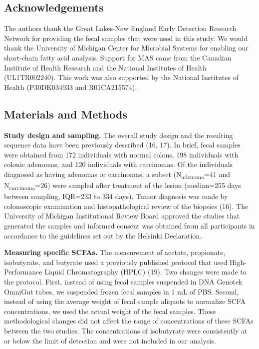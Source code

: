 \documentclass[11pt,]{article}
\begin{document}
\hypertarget{acknowledgements}{%
\subsection{Acknowledgements}\label{acknowledgements}}

The authors thank the Great Lakes-New England Early Detection Research
Network for providing the fecal samples that were used in this study. We
would thank the University of Michigan Center for Microbial Systems for
enabling our short-chain fatty acid analysis. Support for MAS came from
the Canadian Institute of Health Research and the National Institutes of
Health (UL1TR002240). This work was also supported by the National
Institutes of Health (P30DK034933 and R01CA215574).

\newpage

\hypertarget{materials-and-methods}{%
\subsection{Materials and Methods}\label{materials-and-methods}}

\textbf{Study design and sampling.} The overall study design and the
resulting sequence data have been previously described (16, 17). In
brief, fecal samples were obtained from 172 individuals with normal
colons, 198 individuals with colonic adenomas, and 120 individuals with
carcinomas. Of the individuals diagnosed as having adenomas or
carcinomas, a subset (N\textsubscript{adenoma}=41 and
N\textsubscript{carcinoma}=26) were sampled after treatment of the
lesion (median=255 days between sampling, IQR=233 to 334 days). Tumor
diagnosis was made by colonoscopic examination and histopathological
review of the biopsies (16). The University of Michigan Institutional
Review Board approved the studies that generated the samples and
informed consent was obtained from all participants in accordance to the
guidelines set out by the Helsinki Declaration.

\textbf{Measuring specific SCFAs.} The measurement of acetate,
propionate, isobutyrate, and butyrate used a previously published
protocol that used High-Performance Liquid Chromatography (HPLC) (19).
Two changes were made to the protocol. First, instead of using fecal
samples suspended in DNA Genotek OmniGut tubes, we suspended frozen
fecal samples in 1 mL of PBS. Second, instead of using the average
weight of fecal sample aliquots to normalize SCFA concentrations, we
used the actual weight of the fecal samples. These methodological
changes did not affect the range of concentrations of these SCFAs
between the two studies. The concentrations of isobutyrate were
consistently at or below the limit of detection and were not included in
our analysis.
\end{document}
